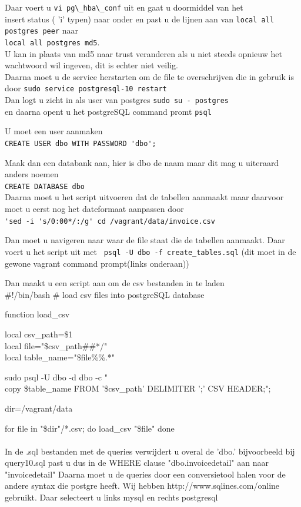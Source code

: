 \documentclass[fleqn,10pt]{artikeltin}
\begin{document}
Daar voert u 
\verb|vi pg\_hba\_conf|
uit en gaat u doormiddel van het \\insert status ( 'i' typen) naar onder en past u de lijnen aan van 
\verb|local all postgres peer|
naar\\
\verb|local all postgres md5|.\\
U kan in plaats van md5 naar trust veranderen als u niet steeds opnieuw het wachtwoord wil ingeven,
dit is echter niet veilig.\\
Daarna moet u de service herstarten om de file te overschrijven die in gebruik is door 
\verb|sudo service postgresql-10 restart|\\
Dan logt u zicht in als user van postgres
\verb|sudo su - postgres|\\
en daarna opent u het postgreSQL command promt 
\verb|psql|

U moet een user aanmaken\\
\verb|CREATE USER dbo WITH PASSWORD 'dbo';|
 

Maak dan een databank aan, hier is dbo de naam maar dit mag u uiteraard anders noemen\\
\verb|CREATE DATABASE dbo|\\

Daarna moet u het script uitvoeren dat de tabellen aanmaakt maar daarvoor moet u eerst nog het dateformaat 
aanpassen door \\
\verb|'sed -i 's/0:00*/:/g' cd /vagrant/data/invoice.csv|

Dan moet u navigeren naar waar de file staat die de tabellen aanmaakt.
Daar voert u het script uit met 
\verb| psql -U dbo -f create_tables.sql|
(dit moet in de gewone vagrant command prompt(links onderaan))

Dan maakt u een script aan om de csv bestanden in te laden\\

\#!/bin/bash  
\# load csv files into postgreSQL database

function load\_csv {
local csv\_path=\$1    \\
local file="\${csv\_path\#\#*/}"   \\
local table\_name="\${file\%\%.*}" 

sudo psql -U dbo -d dbo -c "\\copy \${table\_name} FROM '\${csv\_path}' DELIMITER ';' CSV HEADER;";
}

dir=/vagrant/data

for file in "\${dir}"/*.csv; do
load\_csv "\${file}" 
done \\\\
In de .sql bestanden met de queries verwijdert u overal de 'dbo.' bijvoorbeeld bij query10.sql past u dus in de WHERE clause "dbo.invoicedetail" aan naar "invoicedetail"
Daarna moet u de queries door een conversietool halen voor de andere syntax die postgre heeft. 
Wij hebben http://www.sqlines.com/online gebruikt. Daar selecteert u links mysql en rechts postgresql
\end{document}
